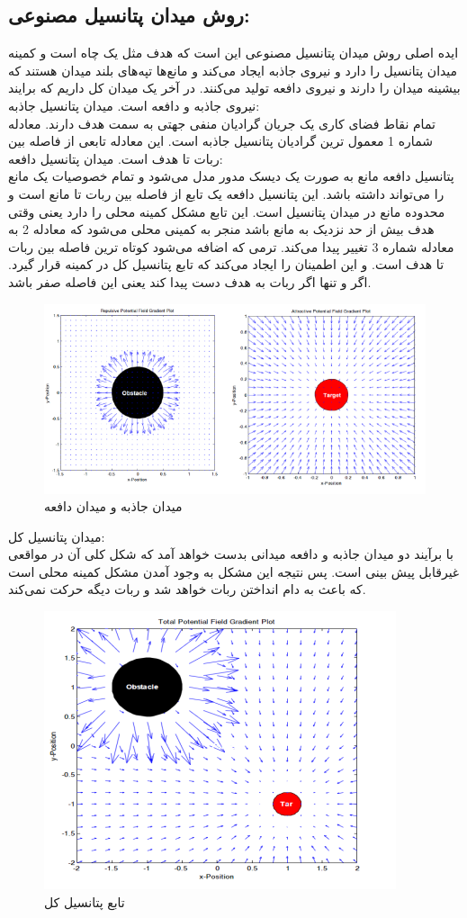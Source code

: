 \subsection{روش میدان پتانسیل مصنوعی:}
ایده اصلی روش میدان پتانسیل مصنوعی این است که هدف مثل یک چاه است و کمینه میدان پتانسیل را دارد و نیروی جاذبه ایجاد می‌کند و مانع‌ها تپه‌های بلند میدان هستند که بیشینه میدان را دارند و نیروی دافعه تولید می‌کنند.
در آخر یک میدان کل داریم که برایند نیروی جاذبه و دافعه است.
میدان پتانسیل جاذبه:
\\
تمام نقاط فضای کاری یک جریان گرادیان منفی جهتی به سمت هدف دارند.
معادله شماره 1 معمول ترین گرادیان پتانسیل جاذبه است.
این معادله تابعی از فاصله بین ربات تا هدف است.
میدان پتانسیل دافعه:
\\
پتانسیل دافعه مانع به صورت یک دیسک مدور مدل می‌شود و تمام خصوصیات یک مانع را می‌تواند داشته باشد.
این پتانسیل دافعه یک تابع از فاصله بین ربات تا مانع است و محدوده مانع در میدان پتانسیل است.
این تابع مشکل کمینه محلی را دارد یعنی وقتی هدف بیش از حد نزدیک به مانع باشد منجر به کمینی محلی می‌شود که معادله 2 به معادله شماره 3 تغییر پیدا می‌کند. ترمی که اضافه می‌شود کوتاه ترین فاصله بین ربات تا هدف است.
و این اطمینان را ایجاد می‌کند که تابع پتانسیل کل در کمینه قرار گیرد. اگر و تنها اگر ربات به هدف دست پیدا کند یعنی این فاصله صفر باشد.
\\
\begin{figure}[h]
	\centering
	\includegraphics[width=0.7\linewidth]{images/7}
	\caption{میدان جاذبه و میدان دافعه}
	\label{fig:7}
\end{figure}
\noindent\unskip

میدان پتانسیل کل:
\\
با برآیند دو میدان جاذبه و دافعه میدانی بدست خواهد آمد که شکل کلی آن در مواقعی غیرقابل پیش بینی است. پس نتیجه این مشکل به وجود آمدن مشکل کمینه محلی است که باعث به دام انداختن ربات خواهد شد و ربات دیگه حرکت نمی‌کند.
\\
\begin{figure}[h]
	\centering
	\includegraphics[width=0.7\linewidth]{images/8}
	\caption{تابع پتانسیل کل}
	\label{fig:8}
\end{figure}
\noindent\unskip

